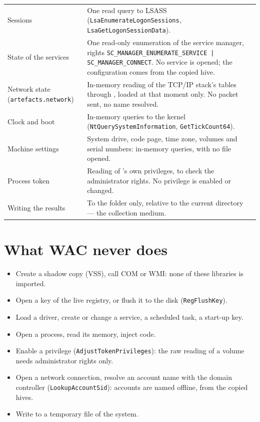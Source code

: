 \documentclass[11pt,a4paper,oneside]{report}
\begin{document}
\begin{longtable}{@{}L{4.3cm}L{10.1cm}@{}}
Sessions & One read query to LSASS (\texttt{LsaEnumerateLogonSessions},
  \texttt{LsaGetLogonSessionData}). \\
State of the services & One read-only enumeration of the service manager,
  rights \texttt{SC\_MANAGER\_ENUMERATE\_SERVICE | SC\_MANAGER\_CONNECT}. No
  service is opened; the configuration comes from the copied hive. \\
Network state (\texttt{artefacts.network}) & In-memory reading of the TCP/IP
  stack's tables through , loaded at that moment only.
  No packet sent, no name resolved. \\
Clock and boot & In-memory queries to the kernel
  (\texttt{NtQuerySystemInformation}, \texttt{GetTickCount64}). \\
Machine settings & System drive, code page, time zone, volumes and serial
  numbers: in-memory queries, with no file opened. \\
Process token & Reading of \wac{}'s own privileges, to check the administrator
  rights. No privilege is enabled or changed. \\
Writing the results & To the  folder only, relative to the current
  directory — the collection medium. \\
\bottomrule
\end{longtable}


\section{What WAC never does}

\begin{itemize}
  \item Create a shadow copy (VSS), call COM or WMI: none of these libraries
        is imported.
  \item Open a key of the live registry, or flush it to the disk
        (\texttt{RegFlushKey}).
  \item Load a driver, create or change a service, a scheduled task, a
        start-up key.
  \item Open a process, read its memory, inject code.
  \item Enable a privilege (\texttt{AdjustTokenPrivileges}): the raw reading
        of a volume needs administrator rights only.
  \item Open a network connection, resolve an account name with the domain
        controller (\texttt{LookupAccountSid}): accounts are named offline,
        from the copied hives.
  \item Write to a temporary file of the system.
\end{itemize}
\end{document}
